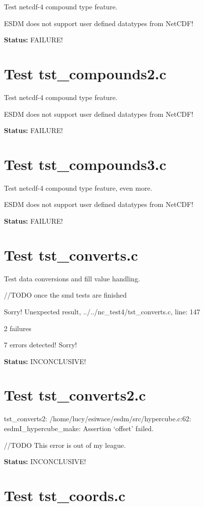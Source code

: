 Test netcdf-4 compound type feature.

ESDM does not support user defined datatypes from NetCDF!

{\bf \large Status: } FAILURE!

\section{Test tst\_compounds2.c}

Test netcdf-4 compound type feature.

ESDM does not support user defined datatypes from NetCDF!

{\bf \large Status: } FAILURE!

\section{Test tst\_compounds3.c}

Test netcdf-4 compound type feature, even more.

ESDM does not support user defined datatypes from NetCDF!

{\bf \large Status: } FAILURE!

\section{Test tst\_converts.c}

Test data conversions and fill value handling.

//TODO once the smd tests are finished

Sorry! Unexpected result, ../../nc\_test4/tst\_converts.c, line: 147

2 failures

7 errors detected! Sorry!

{\bf \large Status: } INCONCLUSIVE!

\section{Test tst\_converts2.c}

tst\_converts2: /home/lucy/esiwace/esdm/src/hypercube.c:62: esdmI\_hypercube\_make: Assertion `offset' failed.

//TODO This error is out of my league.

{\bf \large Status: } INCONCLUSIVE!

\section{Test tst\_coords.c}

